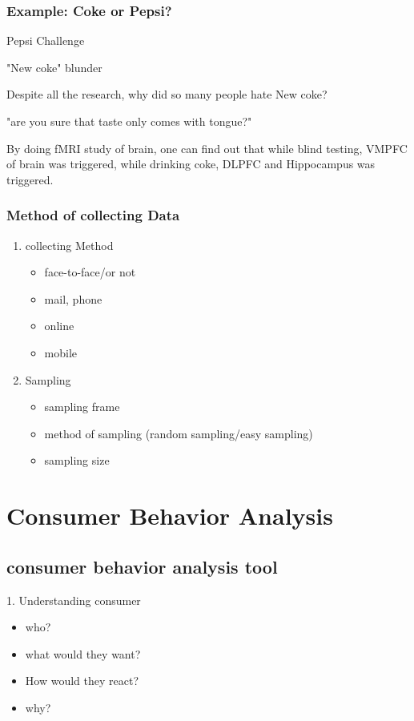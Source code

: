 \documentclass[12pt]{article}
\begin{document}
\subsubsection{Example: Coke or Pepsi?}

Pepsi Challenge

"New coke" blunder

Despite all the research, why did so many people hate New coke?

"are you sure that taste only comes with tongue?"

By doing fMRI study of brain, one can find out that while blind testing, VMPFC of brain was triggered, while drinking coke, DLPFC and Hippocampus was triggered.

\subsubsection{Method of collecting Data}

\begin{enumerate}
	\item collecting Method
	\begin{itemize}
		\item face-to-face/or not
		\item mail, phone
		\item online
		\item mobile
	\end{itemize}
	\item Sampling
	\begin{itemize}
		\item sampling frame
		\item method of sampling (random sampling/easy sampling)
		\item sampling size
	\end{itemize}
\end{enumerate}


\section{Consumer Behavior Analysis}
\subsection{consumer behavior analysis tool}
1. Understanding consumer
\begin{itemize}
	\item who?
	\item what would they want?
	\item How would they react?
	\item why?
\end{itemize}
\end{document}
